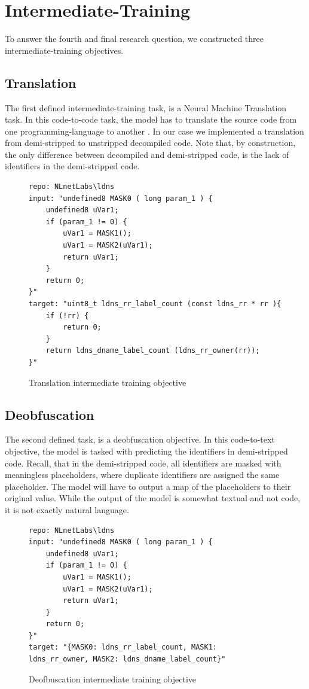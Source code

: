 \section{Intermediate-Training}

To answer the fourth and final research question, we constructed three intermediate-training objectives.

\subsection{Translation}
The first defined intermediate-training task, is a Neural Machine Translation task. In this code-to-code task, the model has to translate the source code from one programming-language to another \cite{CodeXGlue}. 
In our case we implemented a translation from demi-stripped to unstripped decompiled code. Note that, by construction, the only difference between decompiled and demi-stripped code, is the lack of identifiers in the demi-stripped code.

\label{fig:tanslation}
\begin{figure}[H]
  \centering
\begin{lstlisting}
repo: NLnetLabs\ldns
input: "undefined8 MASK0 ( long param_1 ) { 
    undefined8 uVar1; 
    if (param_1 != 0) { 
        uVar1 = MASK1(); 
        uVar1 = MASK2(uVar1); 
        return uVar1; 
    } 
    return 0; 
}"
target: "uint8_t ldns_rr_label_count (const ldns_rr * rr ){ 
    if (!rr) { 
        return 0;
    } 
    return ldns_dname_label_count (ldns_rr_owner(rr));
}"
\end{lstlisting}
  \caption{Translation intermediate training objective}
\end{figure}

\subsection{Deobfuscation}
The second defined task, is a deobfuscation objective. In this code-to-text objective, the model is tasked with predicting the identifiers in demi-stripped code. Recall, that in the demi-stripped code, all identifiers are masked with meaningless placeholders, where duplicate identifiers are assigned the same placeholder. The model will have to output a map of the placeholders to their original value. While the output of the model is somewhat textual and not code, it is not exactly natural language.

\label{fig:dobf}
\begin{figure}[H]
  \centering
\begin{lstlisting}
repo: NLnetLabs\ldns
input: "undefined8 MASK0 ( long param_1 ) { 
    undefined8 uVar1; 
    if (param_1 != 0) { 
        uVar1 = MASK1(); 
        uVar1 = MASK2(uVar1); 
        return uVar1; 
    } 
    return 0; 
}"
target: "{MASK0: ldns_rr_label_count, MASK1:
ldns_rr_owner, MASK2: ldns_dname_label_count}"
\end{lstlisting}
  \caption{Deofbuscation intermediate training objective}
\end{figure}


